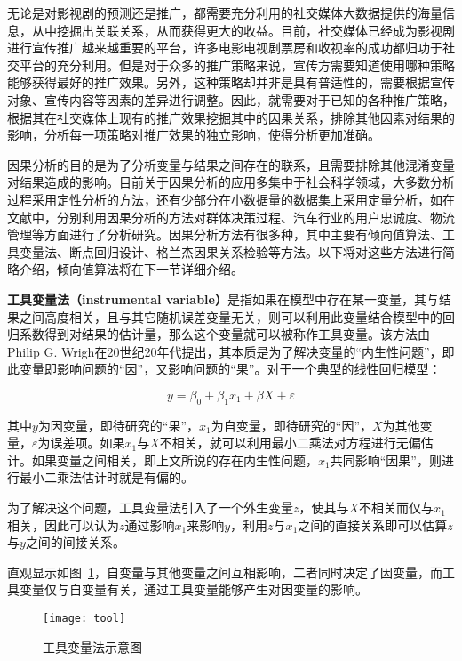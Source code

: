 无论是对影视剧的预测还是推广，都需要充分利用的社交媒体大数据提供的海量信息，从中挖掘出关联关系，从而获得更大的收益。目前，社交媒体已经成为影视剧进行宣传推广越来越重要的平台，许多电影电视剧票房和收视率的成功都归功于社交平台的充分利用。但是对于众多的推广策略来说，宣传方需要知道使用哪种策略能够获得最好的推广效果。另外，这种策略却并非是具有普适性的，需要根据宣传对象、宣传内容等因素的差异进行调整。因此，就需要对于已知的各种推广策略，根据其在社交媒体上现有的推广效果挖掘其中的因果关系，排除其他因素对结果的影响，分析每一项策略对推广效果的独立影响，使得分析更加准确。

因果分析的目的是为了分析变量与结果之间存在的联系，且需要排除其他混淆变量对结果造成的影响。目前关于因果分析的应用多集中于社会科学领域，大多数分析过程采用定性分析的方法，还有少部分在小数据量的数据集上采用定量分析，如在文献\cite{lin2008causal, bauer1997method, giessmann2010complexity}中，分别利用因果分析的方法对群体决策过程、汽车行业的用户忠诚度、物流管理等方面进行了分析研究。因果分析方法有很多种，其中主要有倾向值算法、工具变量法、断点回归设计、格兰杰因果关系检验等方法。以下将对这些方法进行简略介绍，倾向值算法将在下一节详细介绍。


\textbf{工具变量法（instrumental variable）}是指如果在模型中存在某一变量，其与结果之间高度相关，且与其它随机误差变量无关，则可以利用此变量结合模型中的回归系数得到对结果的估计量，那么这个变量就可以被称作工具变量\cite{工具}。该方法由Philip G. Wrigh在20世纪20年代提出\cite{stock2003retrospectives}，其本质是为了解决变量的“内生性问题”，即此变量即影响问题的“因”，又影响问题的“果”\cite{陈云松2012逻辑}。对于一个典型的线性回归模型：

\begin{equation}
y = \beta_0 + \beta_1x_1 + \beta X +  \varepsilon
\end{equation}

其中$y$为因变量，即待研究的“果”，$x_1$为自变量，即待研究的“因”，$X$为其他变量，$\varepsilon$为误差项。如果$x_1$与$X$不相关，就可以利用最小二乘法对方程进行无偏估计。如果变量之间相关，即上文所说的存在内生性问题，$x_1$共同影响“因果”，则进行最小二乘法估计时就是有偏的。

为了解决这个问题，工具变量法引入了一个外生变量$z$，使其与$X$不相关而仅与$x_1$相关，因此可以认为$z$通过影响$x_1$来影响$y$，利用$z$与$x_1$之间的直接关系即可以估算$z$与$y$之间的间接关系\cite{陈云松2012逻辑}。

直观显示如图~\ref{tool}，自变量与其他变量之间互相影响，二者同时决定了因变量，而工具变量仅与自变量有关，通过工具变量能够产生对因变量的影响。

\begin{figure}[h] 
  \centering
  \texttt{[image: tool]}
  \caption{工具变量法示意图}
    \label{tool}
\end{figure}

